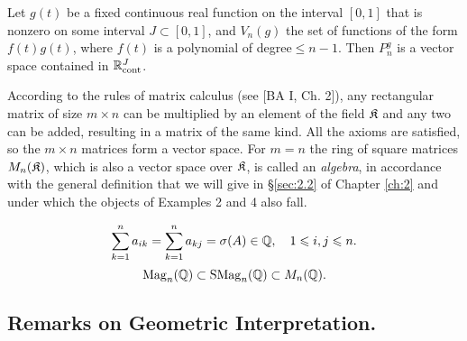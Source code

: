 \begin{example}
	Let $g(t)$ be a fixed continuous real function on the interval $[0,1]$ that is nonzero on some interval $J\subset [0,1]$, and $V_n (g)$ the set of functions of the form $f(t)g(t)$, where $f(t)$ is a polynomial of degree$\le n-1$. Then $P_n^g$ is a vector space contained in ${\mathbb{R}}_{\mathrm{cont}}^J$.
\end{example}

\begin{example}
	According to the rules of matrix calculus (see [BA I, Ch. 2]), any rectangular matrix of size $m\times n$ can be multiplied by an element of the field ${\mathfrak{K}}$ and any two can be added, resulting in a matrix of the same kind. All the axioms are satisfied, so the $m\times n$ matrices form a vector space. For $m = n$ the ring of square matrices $M_n ({\mathfrak{K}})$, which is also a vector space over ${\mathfrak{K}}$, is called an \textit{algebra}, in accordance with the general definition that we will give in \S\ref{sec:2.2} of Chapter \ref{ch:2} and under which the objects of Examples 2 and 4 also fall.
\end{example}
\[\sum_{k=1}^n a_{ik} = \sum_{k=1}^na_{kj} = \sigma (A)\in {\mathbb{Q}},\quad 1\leqslant i,j \leqslant n.\]
\[\mathrm{Mag}_n({\mathbb{Q}}) \subset \mathrm{SMag}_n({\mathbb{Q}}) \subset M_n({\mathbb{Q}}).\]
\subsection{Remarks on Geometric Interpretation.}\label{sec:1.1-3}
